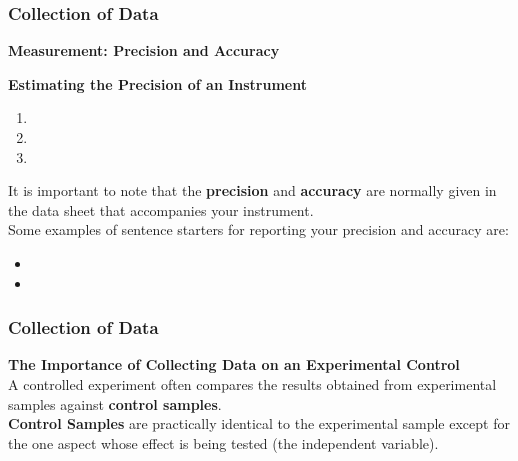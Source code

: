 \documentclass{beamer}
\begin{document}

\begin{frame}[fragile]
\frametitle{Collection of Data}
\textbf{Measurement: Precision and Accuracy}\\
\vspace{0.1cm}
\begin{tcolorbox}
\textbf{Estimating the Precision of an Instrument}
\begin{enumerate}
\item  
\item 
\item 
\end{enumerate}
\end{tcolorbox}
\vspace{0.5cm}
It is important to note that the \textbf{precision} and \textbf{accuracy} are normally given in the data sheet that accompanies your instrument.\\
\vspace{0.5cm}
Some examples of sentence starters for reporting your precision and accuracy are:
\begin{itemize}
\item
\item
\end{itemize}

\end{frame}


\begin{frame}
\frametitle{Collection of Data}
\textbf{The Importance of Collecting Data on an Experimental Control}\\
\vspace{0.5cm}
A controlled experiment often compares the results obtained from experimental samples against \textbf{control samples}.\\
\vspace{0.5cm}
\textbf{Control Samples} are practically identical to the experimental sample except for the one aspect whose effect is being tested (the independent variable).
\end{frame}

\end{document}
